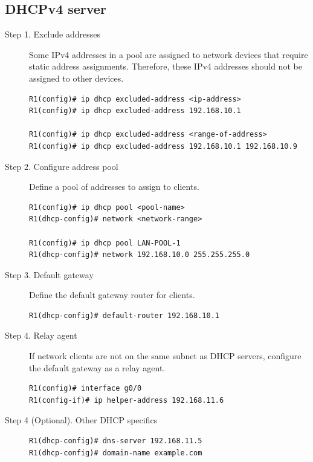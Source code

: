 \subsection{DHCPv4 server}

\begin{description}
\item[Step 1. Exclude addresses]Some IPv4 addresses in a pool are assigned to network devices that require static address assignments. Therefore, these IPv4 addresses should not be assigned to other devices.

\begin{verbatim}
R1(config)# ip dhcp excluded-address <ip-address>
R1(config)# ip dhcp excluded-address 192.168.10.1

R1(config)# ip dhcp excluded-address <range-of-address>
R1(config)# ip dhcp excluded-address 192.168.10.1 192.168.10.9
\end{verbatim}

\item[Step 2. Configure address pool]Define a pool of addresses to assign to clients.

\begin{verbatim}
R1(config)# ip dhcp pool <pool-name>
R1(dhcp-config)# network <network-range>

R1(config)# ip dhcp pool LAN-POOL-1
R1(dhcp-config)# network 192.168.10.0 255.255.255.0
\end{verbatim}

\item[Step 3. Default gateway]Define the default gateway router for clients. 

\begin{verbatim}
R1(dhcp-config)# default-router 192.168.10.1
\end{verbatim}

\item[Step 4. Relay agent]If network clients are not on the same subnet as DHCP servers, configure the default gateway as a relay agent.

\begin{verbatim}
R1(config)# interface g0/0
R1(config-if)# ip helper-address 192.168.11.6
\end{verbatim}

\item[Step 4 (Optional). Other DHCP specifics]

\begin{verbatim}
R1(dhcp-config)# dns-server 192.168.11.5
R1(dhcp-config)# domain-name example.com
\end{verbatim}


\end{description}
